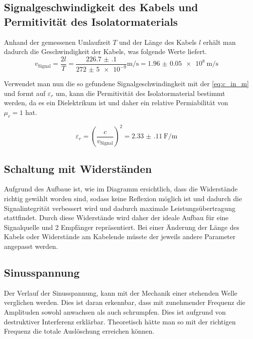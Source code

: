 \documentclass[11pt,ngerman]{scrartcl}
\begin{document}
\subsection{Signalgeschwindigkeit des Kabels und Permitivität des Isolatormaterials}

\noindent Anhand der gemessenen Umlaufzeit $T$ und der Länge des Kabels $l$ erhält man
dadurch die Geschwindigkeit der Kabels, was folgende Werte liefert.
\begin{equation}
	v_{\text{Signal}} = \frac{2l}{T} = \frac{2 \num{26.7(1)}}{\num{272(5)e-9}} \si{\meter\per\second} = \SI{1.96(5)e8}{\meter\per\second}
	\label{eq:Signalgeschwindigkeit}
\end{equation}

\noindent Verwendet man nun die so gefundene Signalgeschwindingkeit mit der
\autoref{eq:c_in_m} und formt auf $\varepsilon_r$ um, kann die Permitivität des
Isolatormaterial bestimmt werden, da es ein Dielektrikum ist und daher ein
relative Permiabilität von $\mu_r = 1$ hat.

\begin{equation}
	\varepsilon_r = \left( \frac{c}{v_{\text{Signal}}} \right)^2 = \SI{2.33(11)}{\farad\per\meter}
	\label{eq:permittivity}
\end{equation}

\subsection{Schaltung mit Widerständen}

Aufgrund des Aufbaue ist, wie im Diagramm ersichtlich, dass die Widerstände
richtig gewählt worden sind, sodass keine Reflexion möglich ist und dadurch die
Signalintegrität verbessert wird und dadurch maximale Leistungsübertragung
stattfindet. Durch diese Widerstände wird daher der ideale Aufbau für eine
Signalquelle und 2 Empfänger repräsentiert. Bei einer Änderung der Länge des
Kabels oder Widerstände am Kabelende müsste der jeweils andere Parameter
angepasst werden.

\subsection{Sinusspannung}

Der Verlauf der Sinusspannung, kann mit der Mechanik einer stehenden Welle
verglichen werden. Dies ist daran erkennbar, dass mit zunehmender Frequenz die
Amplituden sowohl anwachsen als auch schrumpfen. Dies ist aufgrund von
destruktiver Interferenz erklärbar. Theoretisch hätte man so mit der richtigen
Frequenz die totale Auslöschung erreichen können.
\end{document}
